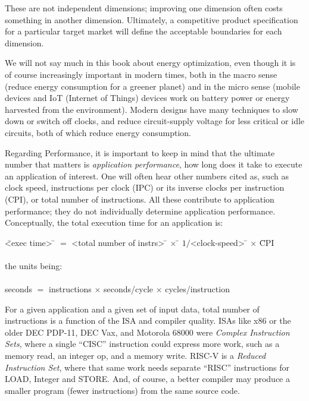 These are not independent dimensions; improving one dimension often
costs something in another dimension.  Ultimately, a competitive
product specification for a particular target market will define the
acceptable boundaries for each dimension.

We will not say much in this book about energy optimization, even
though it is of course increasingly important in modern times, both in
the macro sense (reduce energy consumption for a greener planet) and
in the micro sense (mobile devices and IoT (Internet of Things)
devices work on battery power or energy harvested from the
environment).  Modern designs have many techniques to slow down or
switch off clocks, and reduce circuit-supply voltage for less critical
or idle circuits, both of which reduce energy consumption.

Regarding Performance, it is important to keep in mind that the
ultimate number that matters is \emph{application performance}, {\ie}
how long does it take to execute an application of interest. One will
often hear other numbers cited as, such as clock speed, instructions
per clock (IPC) or its inverse clocks per instruction (CPI), or total
number of instructions.  All these contribute to application
performance; they do not individually determine application
performance.  Conceptually, the total execution time for an
application is:

\begin{tabbing}
\hmmm \= <exec time> \= $=$ <total number of instrs> \hm \= $\times$ \= $1/$<clock-speed> \hm \= $\times$ \= CPI \\
\\
\hm the units being: \\
\\
      \> seconds     \> $=$ instructions                 \> $\times$ \> seconds/cycle         \> $\times$ \> cycles/instruction
\end{tabbing}

For a given application and a given set of input data, total number of
instructions is a function of the ISA and compiler quality.  ISAs like
x86 or the older DEC PDP-11, DEC Vax, and Motorola 68000 were
\emph{Complex Instruction Sets}, where a single ``CISC'' instruction
could express more work, such as a memory read, an integer op, and a
memory write.  RISC-V is a \emph{Reduced Instruction Set}, where that
same work needs separate ``RISC'' instructions for LOAD, Integer and
STORE.  And, of course, a better compiler may produce a smaller
program (fewer instructions) from the same source code.

